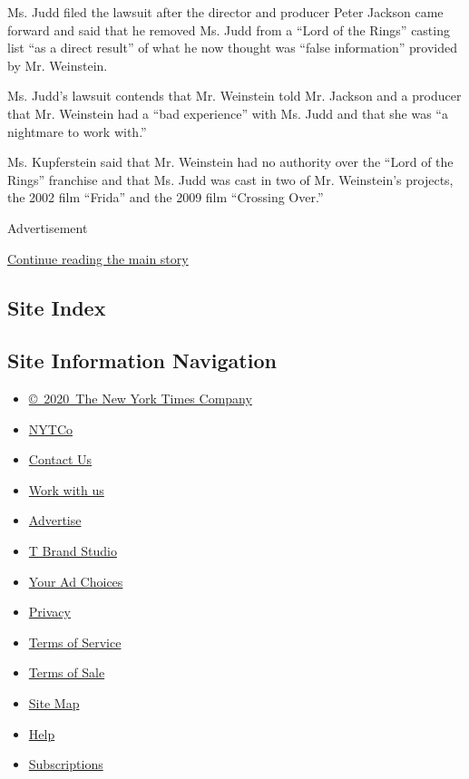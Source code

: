 Ms. Judd filed the lawsuit after the director and producer Peter Jackson
came forward and said that he removed Ms. Judd from a ``Lord of the
Rings'' casting list ``as a direct result'' of what he now thought was
``false information'' provided by Mr. Weinstein.

Ms. Judd's lawsuit contends that Mr. Weinstein told Mr. Jackson and a
producer that Mr. Weinstein had a ``bad experience'' with Ms. Judd and
that she was ``a nightmare to work with.''

Ms. Kupferstein said that Mr. Weinstein had no authority over the ``Lord
of the Rings'' franchise and that Ms. Judd was cast in two of Mr.
Weinstein's projects, the 2002 film ``Frida'' and the 2009 film
``Crossing Over.''

Advertisement

\protect\hyperlink{after-bottom}{Continue reading the main story}

\hypertarget{site-index}{%
\subsection{Site Index}\label{site-index}}

\hypertarget{site-information-navigation}{%
\subsection{Site Information
Navigation}\label{site-information-navigation}}

\begin{itemize}
\tightlist
\item
  \href{https://help.nytimes.com/hc/en-us/articles/115014792127-Copyright-notice}{©~2020~The
  New York Times Company}
\end{itemize}

\begin{itemize}
\tightlist
\item
  \href{https://www.nytco.com/}{NYTCo}
\item
  \href{https://help.nytimes.com/hc/en-us/articles/115015385887-Contact-Us}{Contact
  Us}
\item
  \href{https://www.nytco.com/careers/}{Work with us}
\item
  \href{https://nytmediakit.com/}{Advertise}
\item
  \href{http://www.tbrandstudio.com/}{T Brand Studio}
\item
  \href{https://www.nytimes.com/privacy/cookie-policy\#how-do-i-manage-trackers}{Your
  Ad Choices}
\item
  \href{https://www.nytimes.com/privacy}{Privacy}
\item
  \href{https://help.nytimes.com/hc/en-us/articles/115014893428-Terms-of-service}{Terms
  of Service}
\item
  \href{https://help.nytimes.com/hc/en-us/articles/115014893968-Terms-of-sale}{Terms
  of Sale}
\item
  \href{https://spiderbites.nytimes.com}{Site Map}
\item
  \href{https://help.nytimes.com/hc/en-us}{Help}
\item
  \href{https://www.nytimes.com/subscription?campaignId=37WXW}{Subscriptions}
\end{itemize}
